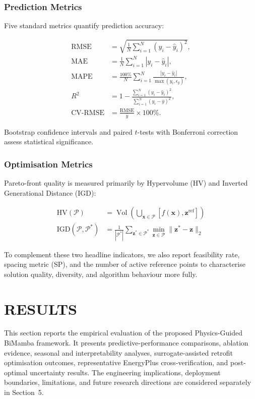 \documentclass[11pt]{article}
\providecommand{\RMSE}{\text{RMSE}}
\providecommand{\MAE}{\text{MAE}}
\providecommand{\MAPE}{\text{MAPE}}
\providecommand{\CVRMSE}{\text{CV-RMSE}}
\begin{document}
\subsubsection{Prediction Metrics}

Five standard metrics quantify prediction accuracy:

\begin{align}
\RMSE &= \sqrt{\frac{1}{N}\sum_{i=1}^{N}(y_i-\hat{y}_i)^2}, \label{eq:rmse} \\
\MAE &= \frac{1}{N}\sum_{i=1}^{N}|y_i-\hat{y}_i|, \label{eq:mae} \\
\MAPE &= \frac{100\%}{N}\sum_{i=1}^{N}\frac{|y_i-\hat{y}_i|}{\max(y_i,\epsilon_y)}, \label{eq:mape} \\
R^2 &= 1-\frac{\sum_{i=1}^{N}(y_i-\hat{y}_i)^2}{\sum_{i=1}^{N}(y_i-\bar{y})^2}, \label{eq:r2} \\
\CVRMSE &= \frac{\RMSE}{\bar{y}}\times 100\%. \label{eq:cvrmse}
\end{align}

Bootstrap confidence intervals and paired $t$-tests with Bonferroni correction assess statistical significance.

\subsubsection{Optimisation Metrics}

Pareto-front quality is measured primarily by Hypervolume (HV) and Inverted Generational Distance (IGD):

\begin{align}
\text{HV}(\mathcal{P}) &= \operatorname{Vol}\left( \bigcup_{\mathbf{x}\in\mathcal{P}} [f(\mathbf{x}),\mathbf{z}^{\text{ref}}] \right) \label{eq:hv} \\
\text{IGD}(\mathcal{P},\mathcal{P}^\ast) &= \frac{1}{|\mathcal{P}^\ast|} \sum_{\mathbf{z}^\ast\in\mathcal{P}^\ast} \min_{\mathbf{z}\in\mathcal{P}} \|\mathbf{z}^\ast-\mathbf{z}\|_2 \label{eq:igd}
\end{align}

To complement these two headline indicators, we also report feasibility rate, spacing metric (SP), and the number of active reference points to characterise solution quality, diversity, and algorithm behaviour more fully.

\section{RESULTS}

This section reports the empirical evaluation of the proposed Physics-Guided BiMamba framework. It presents predictive-performance comparisons, ablation evidence, seasonal and interpretability analyses, surrogate-assisted retrofit optimisation outcomes, representative EnergyPlus cross-verification, and post-optimal uncertainty results. The engineering implications, deployment boundaries, limitations, and future research directions are considered separately in Section~5.
\end{document}
